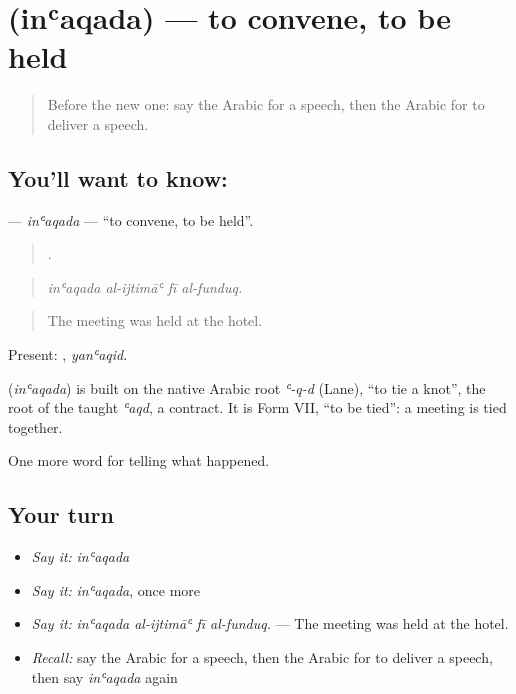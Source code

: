 \section[\texorpdfstring{\ar{انعقد} (inʿaqada)}{انعقد (inʿaqada)}]{ (inʿaqada) — to convene, to be held}

\label{lesson:AR-C357-inaqada}



\begin{quote}
Before the new one: say the Arabic for a speech, then the Arabic for to deliver a speech.
\end{quote}

\subsection*{You'll want to know: }
\textbf{} — \emph{inʿaqada} — \textquotedblleft{}to convene, to be held\textquotedblright{}.

\begin{quote}
   .
\end{quote}

\begin{quote}
\emph{inʿaqada al-ijtimāʿ fī al-funduq.}
\end{quote}

\begin{quote}
The meeting was held at the hotel.
\end{quote}

Present: , \emph{yanʿaqid}.

\begin{cousinweb}
\textbf{} (\emph{inʿaqada}) is built on the native Arabic root \emph{ʿ-q-d} (Lane), \textquotedblleft{}to tie a knot\textquotedblright{}, the root of the taught \emph{ʿaqd}, a contract. It is Form VII, \textquotedblleft{}to be tied\textquotedblright{}: a meeting is tied together.
\end{cousinweb}

\begin{grammarlens}[title={What you've built}]
One more word for telling what happened.
\end{grammarlens}

\subsection*{Your turn}
\begin{itemize}
\raggedright
  \item \emph{Say it:} \emph{inʿaqada}
  \item \emph{Say it:} \emph{inʿaqada}, once more
  \item \emph{Say it:} \emph{inʿaqada al-ijtimāʿ fī al-funduq.} — The meeting was held at the hotel.
  \item \emph{Recall:} say the Arabic for a speech, then the Arabic for to deliver a speech, then say \emph{inʿaqada} again
\end{itemize}

